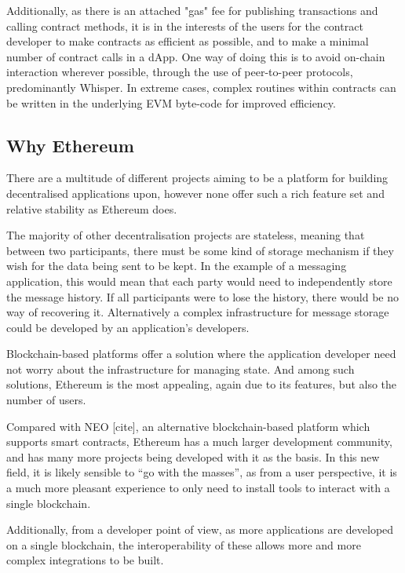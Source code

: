 Additionally, as there is an attached "gas" fee for publishing transactions and calling contract methods, it is in the interests of the users for the contract developer to make contracts as efficient as possible, and to make a minimal number of contract calls in a dApp. One way of doing this is to avoid on-chain interaction wherever possible, through the use of peer-to-peer protocols, predominantly Whisper. In extreme cases, complex routines within contracts can be written in the underlying EVM byte-code for improved efficiency.

\subsection{Why Ethereum}

There are a multitude of different projects aiming to be a platform for building decentralised applications upon, however none offer such a rich feature set and relative stability as Ethereum does.

The majority of other decentralisation projects are stateless, meaning that between two participants, there must be some kind of storage mechanism if they wish for the data being sent to be kept. In the example of a messaging application, this would mean that each party would need to independently store the message history. If all participants were to lose the history, there would be no way of recovering it. Alternatively a complex infrastructure for message storage could be developed by an application's developers.

Blockchain-based platforms offer a solution where the application developer need not worry about the infrastructure for managing state. And among such solutions, Ethereum is the most appealing, again due to its features, but also the number of users.

Compared with NEO [cite], an alternative blockchain-based platform which supports smart contracts, Ethereum has a much larger development community, and has many more projects being developed with it as the basis. In this new field, it is likely sensible to \enquote{go with the masses}, as from a user perspective, it is a much more pleasant experience to only need to install tools to interact with a single blockchain.

Additionally, from a developer point of view, as more applications are developed on a single blockchain, the interoperability of these allows more and more complex integrations to be built.
